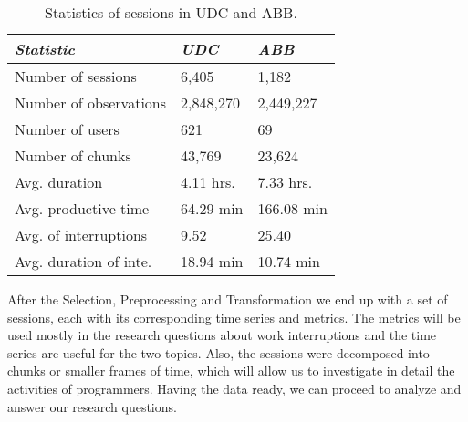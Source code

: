 \begin{table}[ht!]
	\small
	\caption{Statistics of sessions in UDC and ABB. }
	\label{tbl:stats_sessions}
	\centering
	\begin{tabular}{p{3.5cm}|p{2cm}|p{2cm}} 
		\hline
		\emph{Statistic} & \emph{UDC} & \emph{ABB} \\
		\hline
		\hline
		Number of sessions & 6,405 & 1,182 \\
		\hline
		Number of observations & 2,848,270 & 2,449,227 \\
		\hline
		Number of users & 621 & 69 \\
		\hline
		Number of chunks & 43,769 & 23,624 \\
		\hline
		Avg. duration & 4.11 hrs. & 7.33 hrs. \\
		\hline
		Avg. productive time & 64.29 min & 166.08 min \\
		\hline
		Avg. of interruptions & 9.52 & 25.40 \\
		\hline
		Avg. duration of inte. & 18.94 min & 10.74 min \\
		\hline
	\end{tabular}
\end{table}

After the Selection, Preprocessing and Transformation we end up with a set of sessions, each with its corresponding time series and metrics. The metrics will be used mostly in the research questions about work interruptions and the time series are useful for the two topics. Also, the sessions were decomposed into chunks or smaller frames of time, which will allow us to investigate in detail the activities of programmers. Having the data ready, we can proceed to analyze and answer our research questions.
